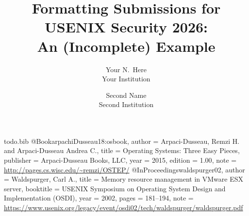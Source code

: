\usepackage{filecontents}

\begin{filecontents}{todo.bib}
@Book{arpachiDusseau18:osbook,
  author =       {Arpaci-Dusseau, Remzi H. and Arpaci-Dusseau Andrea C.},
  title =        {Operating Systems: Three Easy Pieces},
  publisher =    {Arpaci-Dusseau Books, LLC},
  year =         2015,
  edition =      {1.00},
  note =         {\url{http://pages.cs.wisc.edu/~remzi/OSTEP/}}
}
@InProceedings{waldspurger02,
  author =       {Waldspurger, Carl A.},
  title =        {Memory resource management in {VMware ESX} server},
  booktitle =    {USENIX Symposium on Operating System Design and
                  Implementation (OSDI)},
  year =         2002,
  pages =        {181--194},
  note =         {\url{https://www.usenix.org/legacy/event/osdi02/tech/waldspurger/waldspurger.pdf}}}
\end{filecontents}



\usepackage[most]{tcolorbox}



\date{}

\title{\Large \bf Formatting Submissions for USENIX Security 2026:\\
  An (Incomplete) Example}

\author{
{\rm Your N.\ Here}\\
Your Institution
\and
{\rm Second Name}\\
Second Institution
} %

\maketitle

